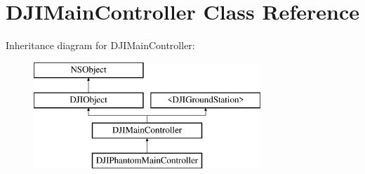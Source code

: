 \hypertarget{interface_d_j_i_main_controller}{\section{D\+J\+I\+Main\+Controller Class Reference}
\label{interface_d_j_i_main_controller}
}
Inheritance diagram for D\+J\+I\+Main\+Controller\+:\begin{figure}[H]
\begin{center}
\leavevmode
\includegraphics[height=4.000000cm]{interface_d_j_i_main_controller}
\end{center}
\end{figure}
